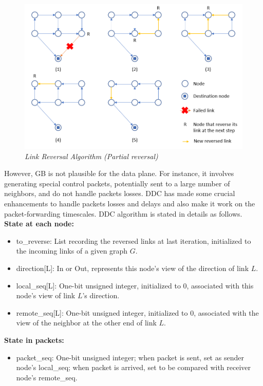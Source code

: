 \begin{figure}[H]
      \centering \includegraphics[scale=0.65]{pictures/partial reversal.png}
      \caption{\it{Link Reversal Algorithm (Partial reversal)}}
\end{figure}

However, GB is not plausible for the data plane. For instance, it involves generating special control packets, potentially sent to a large number of neighbors, and do not handle packets losses. DDC has made some crucial enhancements to handle packets losses and delays and also make it work on the packet-forwarding timescales. DDC algorithm is stated in details as follows.\\

\textbf{State at each node:}
\begin{itemize}
    \item to\_reverse: List recording the reversed links at last iteration, initialized to the incoming links of a given graph $G$. 
    \item direction[L]: In or Out, represents this node's view of the direction of link $L$.
    \item local\_seq[L]: One-bit unsigned integer, initialized to 0, associated with this node's view of link $L$'s direction.
    \item remote\_seq[L]: One-bit unsigned integer, initialized to 0, associated with the view of the neighbor at the other end of link $L$.
\end{itemize}

\textbf{State in packets:}
\begin{itemize}
    \item packet\_seq: One-bit unsigned integer; when packet is sent, set as sender node's local\_seq; when packet is arrived, set to be compared with receiver node's remote\_seq.  
\end{itemize}

